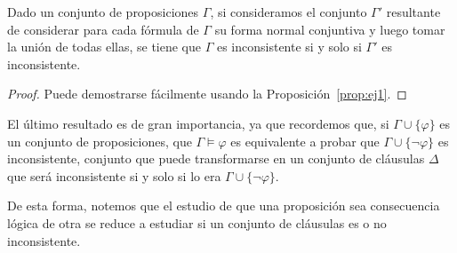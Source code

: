  \begin{prop}
     Dado un conjunto de proposiciones $\Gamma$, si consideramos el conjunto $\Gamma'$ resultante de considerar para cada fórmula de $\Gamma$ su forma normal conjuntiva y luego tomar la unión de todas ellas, se tiene que $\Gamma$ es inconsistente si y solo si $\Gamma'$ es inconsistente.
     \begin{proof}
         Puede demostrarse fácilmente usando la Proposición~\ref{prop:ej1}.
     \end{proof}
 \end{prop}

 El último resultado es de gran importancia, ya que recordemos que, si $\Gamma\cup\{\varphi\}$ es un conjunto de proposiciones, que $\Gamma\vDash\varphi$ es equivalente a probar que $\Gamma\cup\{\lnot\varphi\}$ es inconsistente, conjunto que puede transformarse en un conjunto de cláusulas $\Delta$ que será inconsistente si y solo si lo era $\Gamma\cup\{\lnot\varphi\}$.

 De esta forma, notemos que el estudio de que una proposición sea consecuencia lógica de otra se reduce a estudiar si un conjunto de cláusulas es o no inconsistente.


